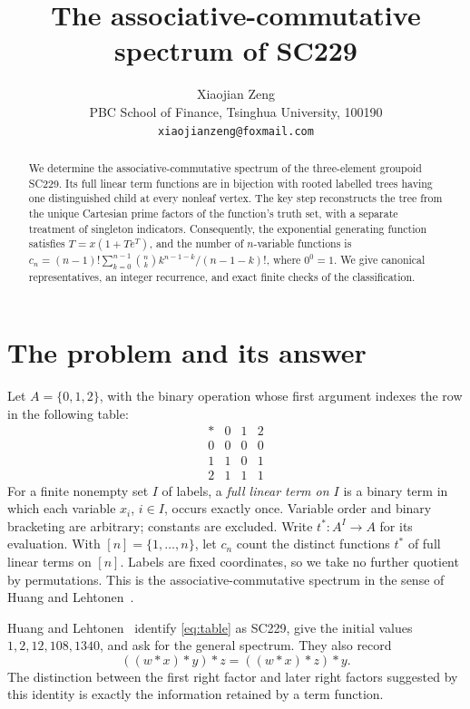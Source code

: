 \documentclass[11pt]{article}
\title{The associative-commutative spectrum of SC229}
\author{Xiaojian Zeng\\[3pt]
  {\small PBC School of Finance, Tsinghua University, 100190}\\
  {\small\texttt{xiaojianzeng@foxmail.com}}}
\date{}
\begin{document}
\maketitle
\begin{abstract}
We determine the associative-commutative spectrum of the three-element
groupoid SC229. Its full linear term functions are in bijection with rooted
labelled trees having one distinguished child at every nonleaf vertex.
The key step reconstructs the tree from the unique Cartesian prime factors
of the function's truth set, with a separate treatment of singleton
indicators. Consequently, the exponential generating function satisfies
$T=x(1+Te^T)$, and the number of $n$-variable functions is
$c_n=(n-1)!\sum_{k=0}^{n-1}\binom{n}{k}k^{n-1-k}/(n-1-k)!$,
where $0^0=1$. We give canonical representatives, an integer recurrence,
and exact finite checks of the classification.
\end{abstract}

\section{The problem and its answer}

Let $A=\{0,1,2\}$, with the binary operation whose first argument indexes
the row in the following table:
\begin{equation}\label{eq:table}
\begin{array}{c|ccc}
\ast&0&1&2\\\hline
0&0&0&0\\
1&1&0&1\\
2&1&1&1
\end{array}
\end{equation}
For a finite nonempty set $I$ of labels, a \emph{full linear term on $I$}
is a binary term in which each variable $x_i$, $i\in I$, occurs exactly
once. Variable order and binary bracketing are arbitrary; constants are
excluded. Write $t^*:A^I\to A$ for its evaluation. With $[n]=\{1,\ldots,n\}$,
let $c_n$ count the distinct functions $t^*$ of full linear terms on $[n]$.
Labels are fixed coordinates, so we take no further quotient by
permutations. This is the associative-commutative spectrum in the sense of
Huang and Lehtonen~\cite{HuangLehtonen2023}.

Huang and Lehtonen~\cite[Section~7]{HuangLehtonen2024} identify
\eqref{eq:table} as SC229, give the initial values
$1,2,12,108,1340$, and ask for the general spectrum. They also record
\begin{equation}\label{eq:interchange}
((w\ast x)\ast y)\ast z=((w\ast x)\ast z)\ast y.
\end{equation}
The distinction between the first right factor and later right factors
suggested by this identity is exactly the information retained by a term
function.
\end{document}
